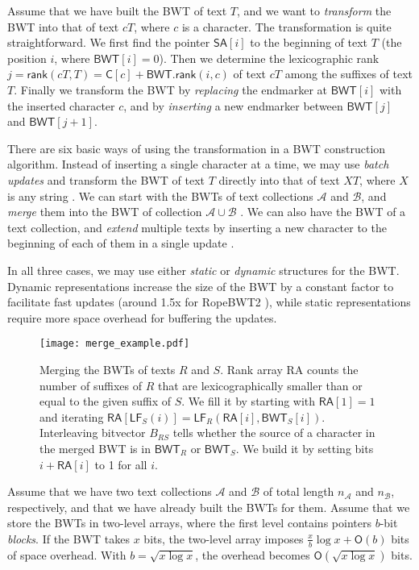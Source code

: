 \documentclass[smallabstract,smallcaptions]{dccpaper}
\newcommand{\Oh}{\ensuremath{\mathsf{O}}}
\newcommand{\BWT}{\textsf{BWT}}
\newcommand{\RA}{\textsf{RA}}
\newcommand{\mSA}{\ensuremath{\mathsf{SA}}}
\newcommand{\mBWT}{\ensuremath{\mathsf{BWT}}}
\newcommand{\mC}{\ensuremath{\mathsf{C}}}
\newcommand{\mRA}{\ensuremath{\mathsf{RA}}}
\newcommand{\mLF}{\ensuremath{\mathsf{LF}}}
\newcommand{\mrank}{\ensuremath{\mathsf{rank}}}
\newcommand{\Acoll}{\ensuremath{\mathcal{A}}}
\newcommand{\Bcoll}{\ensuremath{\mathcal{B}}}
\newcommand{\ropebwtii}{\textsf{RopeBWT2}}
\begin{document}
Assume that we have built the \BWT{} of text $T$, and we want to \emph{transform} the \BWT{} into that of text $cT$, where $c$ is a character. The transformation \cite{Hon2007} is quite straightforward. We first find the pointer $\mSA[i]$ to the beginning of text $T$ (the position $i$, where $\mBWT[i] = 0$). Then we determine the lexicographic rank $j = \mrank(cT, T) = \mC[c] + \mBWT.\mrank(i, c)$ of text $cT$ among the suffixes of text $T$. Finally we transform the \BWT{} by \emph{replacing} the endmarker at $\mBWT[i]$ with the inserted character $c$, and by \emph{inserting} a new endmarker between $\mBWT[j]$ and $\mBWT[j+1]$.

There are six basic ways of using the transformation in a \BWT{} construction algorithm. Instead of inserting a single character at a time, we may use \emph{batch updates} and transform the \BWT{} of text $T$ directly into that of text $XT$, where $X$ is any string \cite{Hon2007}. We can start with the \BWT{}s of text collections $\Acoll$ and $\Bcoll$, and \emph{merge} them into the \BWT{} of collection $\Acoll \cup \Bcoll$ \cite{Siren2009}. We can also have the \BWT{} of a text collection, and \emph{extend} multiple texts by inserting a new character to the beginning of each of them in a single update \cite{Bauer2013}.

In all three cases, we may use either \emph{static} or \emph{dynamic} \cite{Chan2007} structures for the \BWT. Dynamic representations increase the size of the \BWT{} by a constant factor to facilitate fast updates (around 1.5x for \ropebwtii{} \cite{Li2014a}), while static representations require more space overhead for buffering the updates.


\Section{Merging \BWT{}s of text collections}

\begin{figure}[t!]
\texttt{[image: merge\_example.pdf]}
\caption{Merging the \BWT{}s of texts $R$ and $S$. Rank array \RA{} counts the number of suffixes of $R$ that are lexicographically smaller than or equal to the given suffix of $S$. We fill it by starting with $\mRA[1] = 1$ and iterating $\mRA[\mLF_{S}(i)] = \mLF_{R}(\mRA[i], \mBWT_{S}[i])$. Interleaving bitvector $B_{RS}$ tells whether the source of a character in the merged \BWT{} is in $\mBWT_{R}$ or $\mBWT_{S}$. We build it by setting bits $i+\mRA[i]$ to 1 for all $i$.}\label{fig:merge}
\end{figure}

Assume that we have two text collections $\Acoll$ and $\Bcoll$ of total length $n_{\Acoll}$ and $n_{\Bcoll}$, respectively, and that we have already built the \BWT{}s for them. Assume that we store the \BWT{}s in two-level arrays, where the first level contains pointers $b$\nobreakdash-bit \emph{blocks}. If the \BWT{} takes $x$ bits, the two-level array imposes $\frac{x}{b} \log x + \Oh(b)$ bits of space overhead. With $b = \sqrt{x \log x}$, the overhead becomes $\Oh(\sqrt{x \log x})$ bits.
\end{document}
